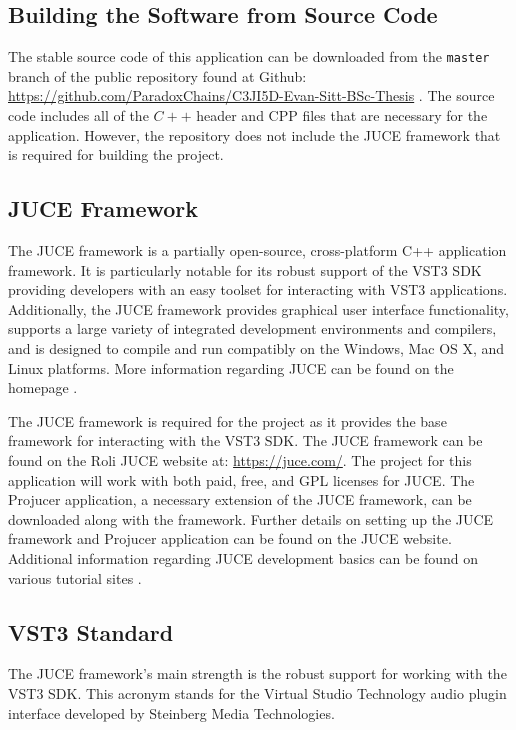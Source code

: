 \documentclass[a4paper,12pt]{report}
\begin{document}
\subsection{Building the Software from Source Code}
\label{subsec:buildingasoftware}
The stable source code of this application can be downloaded from the \texttt{master} branch of the public repository found at Github: \href{https://github.com/ParadoxChains/C3JI5D-Evan-Sitt-BSc-Thesis}{https://github.com/\-ParadoxChains/\-C3JI5D-Evan-Sitt-BSc-Thesis} \cite{github}. The source code includes all of the $C++$ header and CPP files that are necessary for the application. However, the repository does not include the JUCE framework that is required for building the project.

\subsection{JUCE Framework}
\label{subsec:juceframework}
The JUCE framework is a partially open-source, cross-platform C++ application framework. It is particularly notable for its robust support of the VST3 SDK providing developers with an easy toolset for interacting with VST3 applications. Additionally, the JUCE framework provides graphical user interface functionality, supports a large variety of integrated development environments and compilers, and is designed to compile and run compatibly on the Windows, Mac OS X, and Linux platforms. More information regarding JUCE can be found on the homepage \cite{madewithjuce}.

The JUCE framework is required for the project as it provides the base framework for interacting with the VST3 SDK. The JUCE framework can be found on the Roli JUCE website at: \href{https://juce.com/}{https://juce.com/}. The project for this application will work with both paid, free, and GPL licenses for JUCE. The Projucer application, a necessary extension of the JUCE framework, can be downloaded along with the framework. Further details on setting up the JUCE framework and Projucer application can be found on the JUCE website\cite{madewithjuce}. Additional information regarding JUCE development basics can be found on various tutorial sites \cite{jucevstdevelopment}.

\subsection{VST3 Standard}
\label{subsec:vst3standard}
The JUCE framework's main strength is the robust support for working with the VST3 SDK. This acronym stands for the Virtual Studio Technology audio plugin interface developed by Steinberg Media Technologies. 
\end{document}
